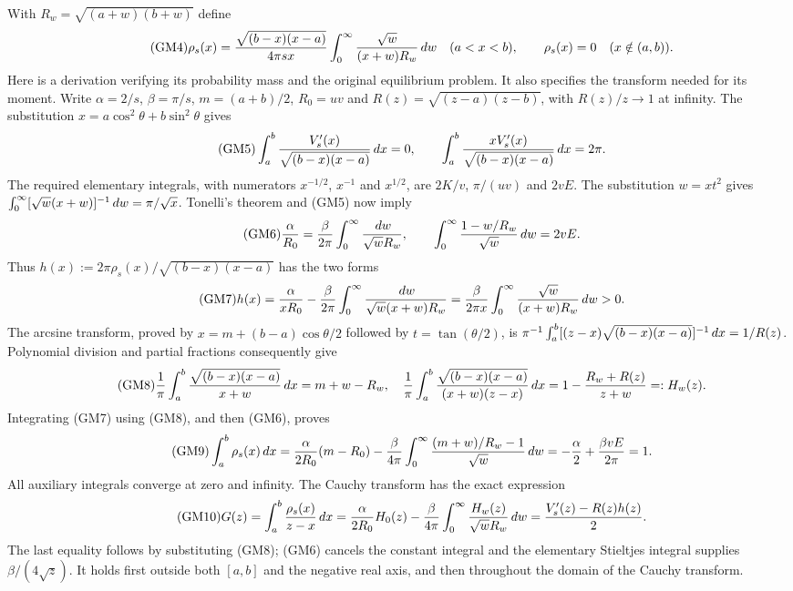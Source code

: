 \documentclass[11pt]{article}
\begin{document}
With $R_w=\sqrt{(a+w)(b+w)}$ define
\begin{equation}\tag{GM4}
 \rho_s(x)=\frac{\sqrt{(b-x)(x-a)}}{4\pi s x}
       \int_0^\infty\frac{\sqrt w}{(x+w)R_w}\,d w\quad(a<x<b),
 \qquad \rho_s(x)=0\quad(x\notin(a,b)).
\end{equation}
Here is a derivation verifying its probability mass and the original
equilibrium problem. It also specifies the transform needed for its moment.
Write $\alpha=2/s$, $\beta=\pi/s$, $m=(a+b)/2$, $R_0=uv$ and
$R(z)=\sqrt{(z-a)(z-b)}$, with $R(z)/z\to1$ at infinity.
The substitution $x=a\cos^2\theta+b\sin^2\theta$ gives
\begin{equation}\tag{GM5}
 \int_a^b\frac{V_s'(x)}{\sqrt{(b-x)(x-a)}}\,d x=0,
 \qquad
 \int_a^b\frac{xV_s'(x)}{\sqrt{(b-x)(x-a)}}\,d x=2\pi.
\end{equation}
The required elementary integrals, with numerators $x^{-1/2}$,
$x^{-1}$ and $x^{1/2}$, are $2K/v$, $\pi/(uv)$ and $2vE$.
The substitution $w=xt^2$ gives
$\int_0^\infty[\sqrt w(x+w)]^{-1}\,d w=\pi/\sqrt x$.
Tonelli's theorem and (GM5) now imply
\begin{equation}\tag{GM6}
 \frac\alpha{R_0}=\frac\beta{2\pi}
       \int_0^\infty\frac{\,d w}{\sqrt wR_w},\qquad
 \int_0^\infty\frac{1-w/R_w}{\sqrt w}\,d w=2vE.
\end{equation}
Thus $h(x):=2\pi\rho_s(x)/\sqrt{(b-x)(x-a)}$ has the two forms
\begin{equation}\tag{GM7}
 h(x)=\frac\alpha{xR_0}-\frac\beta{2\pi}
       \int_0^\infty\frac{\,d w}{\sqrt w(x+w)R_w}
 =\frac\beta{2\pi x}\int_0^\infty\frac{\sqrt w}{(x+w)R_w}\,d w>0.
\end{equation}
The arcsine transform, proved by $x=m+(b-a)\cos\theta/2$ followed
by $t=\tan(\theta/2)$, is
$\pi^{-1}\int_a^b[(z-x)\sqrt{(b-x)(x-a)}]^{-1}\,d x=1/R(z)$.
Polynomial division and partial fractions consequently give
\begin{equation}\tag{GM8}
 \frac1\pi\int_a^b\frac{\sqrt{(b-x)(x-a)}}{x+w}\,d x=m+w-R_w,
 \quad
 \frac1\pi\int_a^b\frac{\sqrt{(b-x)(x-a)}}{(x+w)(z-x)}\,d x
 =1-\frac{R_w+R(z)}{z+w}=:H_w(z).
\end{equation}
Integrating (GM7) using (GM8), and then (GM6), proves
\begin{equation}\tag{GM9}
 \int_a^b\rho_s(x)\,d x
 =\frac\alpha{2R_0}(m-R_0)-\frac\beta{4\pi}
  \int_0^\infty\frac{(m+w)/R_w-1}{\sqrt w}\,d w
 =-\frac\alpha2+\frac{\beta vE}{2\pi}=1.
\end{equation}
All auxiliary integrals converge at zero and infinity. The Cauchy transform
has the exact expression
\begin{equation}\tag{GM10}
 G(z)=\int_a^b\frac{\rho_s(x)}{z-x}\,d x
 =\frac\alpha{2R_0}H_0(z)-\frac\beta{4\pi}
       \int_0^\infty\frac{H_w(z)}{\sqrt wR_w}\,d w
 =\frac{V_s'(z)-R(z)h(z)}2.
\end{equation}
The last equality follows by substituting (GM8); (GM6) cancels the
constant integral and the elementary Stieltjes integral supplies
$\beta/(4\sqrt z)$. It holds first outside both $[a,b]$ and the
negative real axis, and then throughout the domain of the Cauchy transform.
\end{document}
